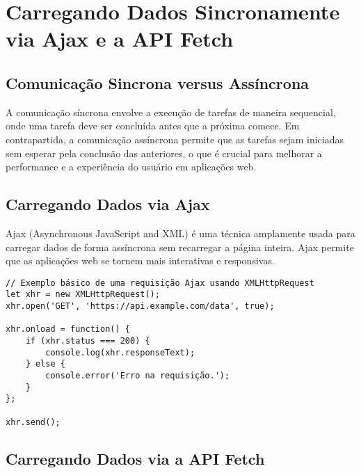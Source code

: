 
\section{Carregando Dados Sincronamente via Ajax e a API Fetch}

\subsection{Comunicação Sincrona versus Assíncrona}
A comunicação síncrona envolve a execução de tarefas de maneira sequencial, onde uma tarefa deve ser concluída antes que a próxima comece. Em contrapartida, a comunicação assíncrona permite que as tarefas sejam iniciadas sem esperar pela conclusão das anteriores, o que é crucial para melhorar a performance e a experiência do usuário em aplicações web.


\subsection{Carregando Dados via Ajax}
Ajax (Asynchronous JavaScript and XML) é uma técnica amplamente usada para carregar dados de forma assíncrona sem recarregar a página inteira. Ajax permite que as aplicações web se tornem mais interativas e responsivas.

\begin{verbatim}
// Exemplo básico de uma requisição Ajax usando XMLHttpRequest
let xhr = new XMLHttpRequest();
xhr.open('GET', 'https://api.example.com/data', true);

xhr.onload = function() {
    if (xhr.status === 200) {
        console.log(xhr.responseText);
    } else {
        console.error('Erro na requisição.');
    }
};

xhr.send();
\end{verbatim}


\subsection{Carregando Dados via a API Fetch}

